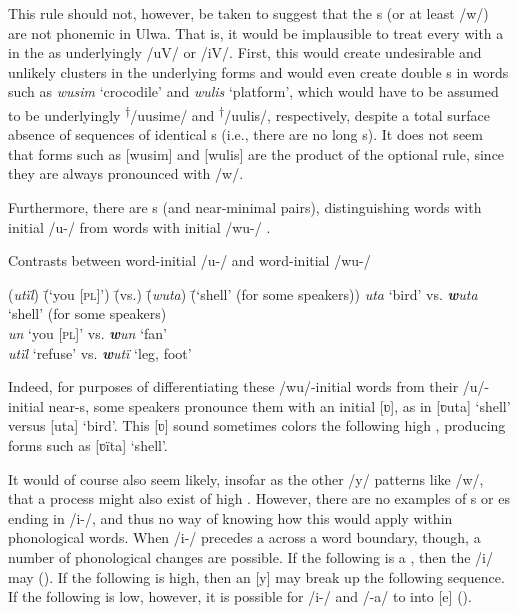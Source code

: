 This rule  should not, however, be taken to suggest that the s (or at least /w/) are not phonemic in Ulwa. That is, it would be implausible to treat every  with a  in the  as underlyingly /uV/ or /iV/. First, this would create undesirable and unlikely  clusters in the underlying forms and would even create double s in words such as \textit{wusim} ‘crocodile’ and \textit{wulis} ‘platform’, which would have to be assumed to be underlyingly \textsuperscript{†}/uusime/ and \textsuperscript{†}/uulis/, respectively, despite a total surface absence of sequences of identical s (i.e., there are no long s). It does not seem that forms such as [wusim] and [wulis] are the product of the optional   rule, since they are always pronounced with /w/.


Furthermore, there are s (and near-minimal pairs), distinguishing words with initial /u-/ from words with initial /wu-/ .

\ea%
    \label{ex:phon:69}
          Contrasts between word-initial /u-/ and word-initial /wu-/\\
\begin{tabbing}
{(\textit{utïl})} \= {(‘you [\textsc{pl}]’)} \= {(vs.)} \= {(\textit{w\textbf{}uta})} \= {(‘shell’ (for some speakers))}\kill
{\textit{uta}} \> {‘bird’} \> {vs.} \> {\textit{\textbf{w}uta}} \> {‘shell’ (for some speakers)}\\
{\textit{un}} \> {‘you [\textsc{pl}]’} \> {vs.} \> {\textit{\textbf{w}un}} \> {‘fan’}\\
{\textit{utïl}} \> {‘refuse’} \> {vs.} \> {\textit{\textbf{w}utï}} \> {‘leg, foot’}
\end{tabbing}
\z

Indeed, for purposes of differentiating these /wu/-initial words from their /u/-initial near-s, some speakers pronounce them with an initial  [ʋ], as in [ʋuta] ‘shell’ versus [uta] ‘bird’. This [ʋ] sound sometimes colors the following high , producing forms such as [ʋïta] ‘shell’.

  It would of course also seem likely, insofar as the other  /y/ patterns like /w/, that a process might also exist of high  . However, there are no examples of s or es ending in /i-/, and thus no way of knowing how this would apply within phonological words. When /i-/ precedes a  across a word boundary, though, a number of phonological changes are possible. If the following  is a , then the /i/ may  (). If the following  is high, then an   [y] may break up the following sequence. If the following  is low, however, it is possible for /i-/ and /-a/ to  into [e] ().

